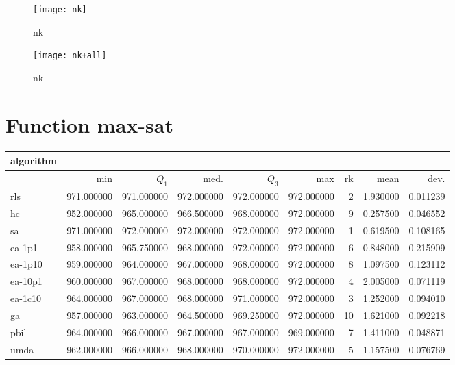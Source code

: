 \begin{center}
\begin{figure}[h]
\centering
\texttt{[image: nk]}
\caption{nk}
\end{figure}
\end{center}

\begin{center}
\begin{figure}[h]
\centering
\texttt{[image: nk+all]}
\caption{nk}
\end{figure}
\end{center}

\newpage

\section{Function max-sat}
\begin{center}
\begin{tabular}{@{}l*{5}{>{{}}N{3}{0}}>{{}}N{2}{0}N{1}{3}N{1}{3}@{}}
\toprule
{algorithm} &  &  \\
\midrule
& {min} & {$Q_1$} & {med.} & {$Q_3$} & {max} & {rk} & {mean} & {dev.} \\
\midrule
rls & {\color{blue}} 971.000000 & 971.000000 & {\color{blue}} 972.000000 & {\color{blue}} 972.000000 & {\color{blue}} 972.000000 & 2 & 1.930000 & 0.011239 \\
 hc & 952.000000 & 965.000000 & 966.500000 & 968.000000 & {\color{blue}} 972.000000 & 9 & 0.257500 & 0.046552 \\
 sa & {\color{blue}} 971.000000 & {\color{blue}} 972.000000 & {\color{blue}} 972.000000 & {\color{blue}} 972.000000 & {\color{blue}} 972.000000 & 1 & 0.619500 & 0.108165 \\
 ea-1p1 & 958.000000 & 965.750000 & 968.000000 & {\color{blue}} 972.000000 & {\color{blue}} 972.000000 & 6 & 0.848000 & 0.215909 \\
 ea-1p10 & 959.000000 & 964.000000 & 967.000000 & 968.000000 & {\color{blue}} 972.000000 & 8 & 1.097500 & 0.123112 \\
 ea-10p1 & 960.000000 & 967.000000 & 968.000000 & 968.000000 & {\color{blue}} 972.000000 & 4 & 2.005000 & 0.071119 \\
 ea-1c10 & 964.000000 & 967.000000 & 968.000000 & 971.000000 & {\color{blue}} 972.000000 & 3 & 1.252000 & 0.094010 \\
 ga & 957.000000 & 963.000000 & 964.500000 & 969.250000 & {\color{blue}} 972.000000 & 10 & 1.621000 & 0.092218 \\
 pbil & 964.000000 & 966.000000 & 967.000000 & 967.000000 & 969.000000 & 7 & 1.411000 & 0.048871 \\
 umda & 962.000000 & 966.000000 & 968.000000 & 970.000000 & {\color{blue}} 972.000000 & 5 & 1.157500 & 0.076769 \\
 \bottomrule
\end{tabular}
\end{center}

